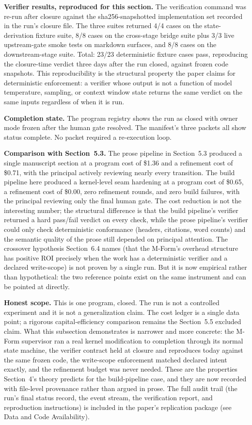 \documentclass[11pt]{article}
\begin{document}
\textbf{Verifier results, reproduced for this section.} The verification command was re-run after closure against the sha256-snapshotted implementation set recorded in the run's closure file. The three suites returned 4/4 cases on the state-derivation fixture suite, 8/8 cases on the cross-stage bridge suite plus 3/3 live upstream-gate smoke tests on markdown surfaces, and 8/8 cases on the downstream-stage suite. Total: 23/23 deterministic fixture cases pass, reproducing the closure-time verdict three days after the run closed, against frozen code snapshots. This reproducibility is the structural property the paper claims for deterministic enforcement: a verifier whose output is not a function of model temperature, sampling, or context window state returns the same verdict on the same inputs regardless of when it is run.

\textbf{Completion state.} The program registry shows the run as closed with owner mode frozen after the human gate resolved. The manifest's three packets all show status complete. No packet required a re-execution loop.

\textbf{Comparison with Section~5.3.} The prose pipeline in Section~5.3 produced a single manuscript section at a program cost of \$1.36 and a refinement cost of \$0.71, with the principal actively reviewing nearly every transition. The build pipeline here produced a kernel-level seam hardening at a program cost of \$0.65, a refinement cost of \$0.00, zero refinement rounds, and zero build failures, with the principal reviewing only the final human gate. The cost reduction is not the interesting number; the structural difference is that the build pipeline's verifier returned a hard pass/fail verdict on every check, while the prose pipeline's verifier could only check deterministic conformance (headers, citations, word counts) and the semantic quality of the prose still depended on principal attention. The crossover hypothesis Section~6.4 names (that the M-Form's overhead structure has positive ROI precisely when the work has a deterministic verifier and a declared write-scope) is not proven by a single run. But it is now empirical rather than hypothetical: the two reference points exist on the same instrument and can be pointed at directly.

\textbf{Honest scope.} This is one program, closed. The run is not a controlled experiment and it is not a generalization claim. The cost ledger is a single data point; a rigorous capital-efficiency comparison remains the Section~5.5 excluded claim. What this subsection demonstrates is narrower and more concrete: the M-Form supervisor ran a real kernel modification to completion through its normal state machine, the verifier contract held at closure and reproduces today against the same frozen code, the write-scope enforcement matched declared intent exactly, and the refinement budget was never needed. These are the properties Section~4's theory predicts for the build-pipeline case, and they are now recorded with file-level provenance rather than argued in prose. The full audit trail (the run's final status record, the event stream, the verification report, and reproduction instructions) is included in the paper's replication package (see Data and Code Availability).
\end{document}
